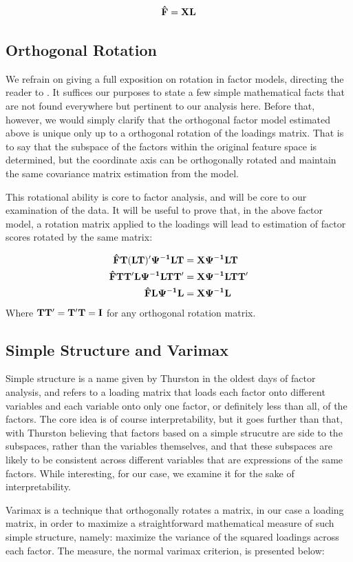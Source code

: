 \documentclass[a4paper,12pt]{article}
\begin{document}
$$
\mathbf{\hat{F}} = \mathbf{X}\mathbf{L}
$$
%
\subsection{Orthogonal Rotation}
%
We refrain on giving a full exposition on rotation in factor models, directing the reader to \cite{}. It suffices our purposes to state a few simple mathematical facts that are not found everywhere but pertinent to our analysis here. Before that, however, we would simply clarify that the orthogonal factor model estimated above is unique only up to a orthogonal rotation of the loadings matrix. That is to say that the subspace of the factors within the original feature space is determined, but the coordinate axis can be orthogonally rotated and maintain the same covariance matrix estimation from the model.

This rotational ability is core to factor analysis, and will be core to our examination of the data. It will be useful to prove that, in the above factor model, a rotation matrix applied to the loadings will lead to estimation of factor scores rotated by the same matrix:

\begin{align*}
\mathbf{\hat{F}T(LT)'\Psi^{-1}LT} &= \mathbf{X\Psi^{-1}LT} \\
\mathbf{\hat{F}TT'L\Psi^{-1}LTT'} &= \mathbf{X\Psi^{-1}LTT'} \\
\mathbf{\hat{F}L\Psi^{-1}L} &= \mathbf{X\Psi^{-1}L}
\end{align*}
%
Where $\mathbf{TT'} = \mathbf{T'T} = \mathbf{I}$ for any orthogonal rotation matrix.

\subsection{Simple Structure and Varimax}

Simple structure is a name given by Thurston in the oldest days of factor analysis, and refers to a loading matrix that loads each factor onto different variables and each variable onto only one factor, or definitely less than all, of the factors. The core idea is of course interpretability, but it goes further than that, with Thurston believing that factors based on a simple strucutre are side to the subspaces, rather than the variables themselves, and that these subspaces are likely to be consistent across different variables that are expressions of the same factors. While interesting, for our case, we examine it for the sake of interpretability.

Varimax is a technique that orthogonally rotates a matrix, in our case a loading matrix, in order to maximize a straightforward mathematical measure of such simple structure, namely: maximize the variance of the squared loadings across each factor. The measure, the normal varimax criterion, is presented below:
\end{document}
